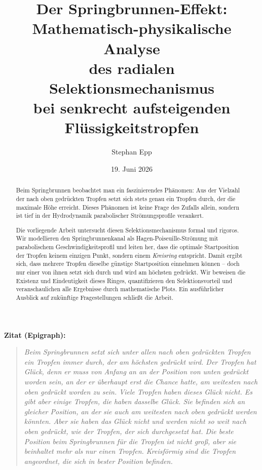 ﻿\documentclass[a4paper,12pt]{article}
\title{Der Springbrunnen-Effekt:\\
\large Mathematisch-physikalische Analyse\\
des radialen Selektionsmechanismus\\
bei senkrecht aufsteigenden Flüssigkeitstropfen}
\author{Stephan Epp}
\date{19. Juni 2026}
\theoremstyle{definition}
\begin{document}
\maketitle

\begin{abstract}
Beim Springbrunnen beobachtet man ein faszinierendes Phänomen: Aus der Vielzahl der nach oben
gedrückten Tropfen setzt sich stets genau ein Tropfen durch, der die maximale Höhe erreicht.
Dieses Phänomen ist keine Frage des Zufalls allein, sondern ist tief in der Hydrodynamik
parabolischer Strömungsprofile verankert.

\medskip

Die vorliegende Arbeit untersucht diesen Selektionsmechanismus formal und rigoros.
Wir modellieren den Springbrunnenkanal als Hagen-Poiseuille-Strömung mit parabolischem
Geschwindigkeitsprofil und leiten her, dass die optimale Startposition der Tropfen keinem
einzigen Punkt, sondern einem \emph{Kreisring} entspricht. Damit ergibt sich, dass
mehrere Tropfen dieselbe günstige Startposition einnehmen können -- doch nur einer von ihnen
setzt sich durch und wird am höchsten gedrückt. Wir beweisen die Existenz und Eindeutigkeit
dieses Ringes, quantifizieren den Selektionsvorteil und veranschaulichen alle Ergebnisse durch
mathematische Plots. Ein ausführlicher Ausblick auf zukünftige Fragestellungen schließt die Arbeit.
\end{abstract}

\bigskip

\noindent\textbf{Zitat (Epigraph):}\\[4pt]
\begin{quote}
\itshape
Beim Springbrunnen setzt sich unter allen nach oben gedrückten Tropfen ein Tropfen immer durch,
der am höchsten gedrückt wird.
Der Tropfen hat Glück, denn er muss von Anfang an an der Position von unten gedrückt worden sein,
an der er überhaupt erst die Chance hatte, am weitesten nach oben gedrückt worden zu sein.
Viele Tropfen haben dieses Glück nicht.
Es gibt aber einige Tropfen, die haben dasselbe Glück.
Sie befinden sich an gleicher Position, an der sie auch am weitesten nach oben gedrückt werden könnten.
Aber sie haben das Glück nicht und werden nicht so weit nach oben gedrückt,
wie der Tropfen, der sich durchgesetzt hat.
Die beste Position beim Springbrunnen für die Tropfen ist nicht groß,
aber sie beinhaltet mehr als nur einen Tropfen.
Kreisförmig sind die Tropfen angeordnet, die sich in bester Position befinden.
\end{quote}
\end{document}
